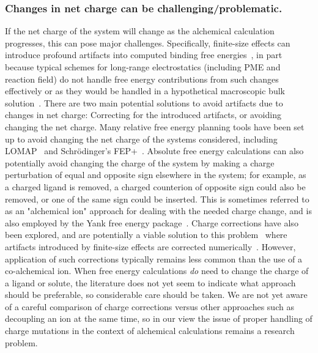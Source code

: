 \documentclass[9pt,bestpractices]{livecoms}
\begin{document}
\subsubsection{Changes in net charge can be challenging/problematic.}
If the net charge of the system will change as the alchemical calculation progresses, this can pose major challenges.
Specifically, finite-size effects can introduce profound artifacts into computed binding free energies~\cite{}, in part because typical schemes for long-range electrostatics (including PME and reaction field) do not handle free energy contributions from such changes effectively or as they would be handled in a hypothetical macroscopic bulk solution~\cite{}.
%
There are two main potential solutions to avoid artifacts due to changes in net charge: Correcting for the introduced artifacts, or avoiding changing the net charge.
%
Many relative free energy planning tools have been set up to avoid changing the net charge of the systems considered, including LOMAP~\cite{liu2013lead} and Schr\"{o}dinger's FEP+~\cite{wang2015accurate}. Absolute free energy calculations can also potentially avoid changing the charge of the system by making a charge perturbation of equal and opposite sign elsewhere in the system; for example, as a charged ligand is removed, a charged counterion of opposite sign could also be removed, or one of the same sign could be inserted. This is sometimes referred to as an "alchemical ion" approach for dealing with the needed charge change, and is also employed by the Yank free energy package~\cite{wang2013identifying}.
Charge corrections have also been explored, and are potentially a viable solution to this problem~\cite{mey2018impact} where artifacts introduced by finite-size effects are corrected numerically~\cite{chen2018accurate}. However, application of such corrections typically remains less common than the use of a co-alchemical ion.
%
When free energy calculations \emph{do} need to change the charge of a ligand or solute, the literature does not yet seem to indicate what approach should be preferable, so considerable care should be taken.
We are not yet aware of a careful comparison of charge corrections versus other approaches such as decoupling an ion at the same time, so in our view the issue of proper handling of charge mutations in the context of alchemical calculations remains a research problem.
%
\end{document}
